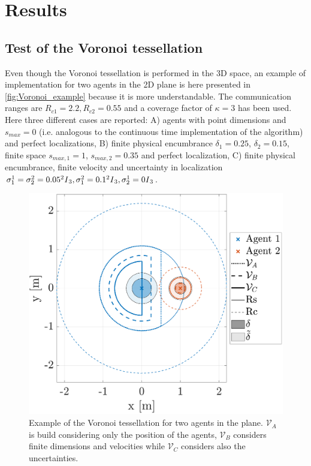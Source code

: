 \section{Results}
\subsection{Test of the Voronoi tessellation}
Even though the Voronoi tessellation is performed in the 3D space, an example of implementation for two agents in the 2D plane is here presented in \autoref{fig:Voronoi_example} because it is more understandable. The communication ranges are $R_{c1}=2.2, R_{c2}=0.55$ and a coverage factor of $\kappa=3$ has been used.  Here three different cases are reported: A) agents with point dimensions and $s_{max}=0$ (i.e. analogous to the continuous time implementation of the algorithm) and perfect localizations, B) finite physical encumbrance $\delta_1=0.25$, $\delta_2=0.15$, finite space $s_{max,1}=1$, $s_{max,2}=0.35$ and perfect localization, C) finite physical encumbrance, finite velocity and uncertainty in localization $\sigma_{1}^1=\sigma_{2}^2=0.05^2 \text{\textit{I}}_3, \sigma_{1}^2=0.1^2 \text{\textit{I}}_3, \sigma_{2}^1=0 \text{\textit{I}}_3$.
\begin{figure}[htb]
\centering
    \includegraphics[width=0.7\columnwidth]{images/fig_voronoi_example.eps}
    \caption{Example of the Voronoi tessellation for two agents in the plane. $\mathcal{V}_A$ is build considering only the position of the agents, $\mathcal{V}_B$ considers finite dimensions and velocities while $\mathcal{V}_C$ considers also the uncertainties.}
    \label{fig:Voronoi_example}
\end{figure}
